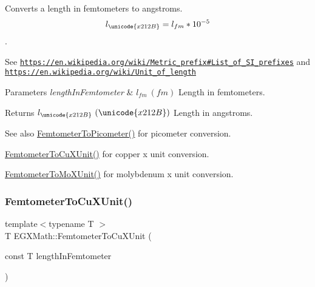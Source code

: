 Converts a length in femtometers to angstroms. \[ l_{\unicode{x212B}}=l_{fm} * 10^{-5} \]. 

See \href{https://en.wikipedia.org/wiki/Metric_prefix#List_of_SI_prefixes}{\tt https\+://en.\+wikipedia.\+org/wiki/\+Metric\+\_\+prefix\#\+List\+\_\+of\+\_\+\+S\+I\+\_\+prefixes} and \href{https://en.wikipedia.org/wiki/Unit_of_length}{\tt https\+://en.\+wikipedia.\+org/wiki/\+Unit\+\_\+of\+\_\+length} 
\begin{DoxyParams}{Parameters}
{\em length\+In\+Femtometer} & $ l_{fm}\ (fm)$ Length in femtometers. \\
\hline
\end{DoxyParams}
\begin{DoxyReturn}{Returns}
$ l_{\unicode{x212B}}\ (\unicode{x212B})$ Length in angstroms. 
\end{DoxyReturn}
\begin{DoxySeeAlso}{See also}
\mbox{\hyperlink{group___e_g_x_math-_conversions-_length_conversions-_s_i-_femtometer-_s_i_gadfcd6b374d4134cad0ac1ce7a8e50509}{Femtometer\+To\+Picometer()}} for picometer conversion. 

\mbox{\hyperlink{group___e_g_x_math-_conversions-_length_conversions-_s_i-_femtometer-_non-_s_i_ga59bde341fe80506851e39cd2ceb3747b}{Femtometer\+To\+Cu\+X\+Unit()}} for copper x unit conversion. 

\mbox{\hyperlink{group___e_g_x_math-_conversions-_length_conversions-_s_i-_femtometer-_non-_s_i_ga57801d7c681362c1a11053233e31c415}{Femtometer\+To\+Mo\+X\+Unit()}} for molybdenum x unit conversion. 
\end{DoxySeeAlso}
\mbox{\label{group___e_g_x_math-_conversions-_length_conversions-_s_i-_femtometer-_non-_s_i_ga59bde341fe80506851e39cd2ceb3747b}} 
\subsubsection{\texorpdfstring{Femtometer\+To\+Cu\+X\+Unit()}{FemtometerToCuXUnit()}}
{\footnotesize\ttfamily template$<$typename T $>$ \\
T E\+G\+X\+Math\+::\+Femtometer\+To\+Cu\+X\+Unit (\begin{DoxyParamCaption}\item[{const T}]{length\+In\+Femtometer }\end{DoxyParamCaption})}



